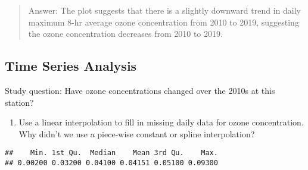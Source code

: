 \documentclass[
]{article}
\newenvironment{Shaded}{\begin{snugshade}}{\end{snugshade}}
\newcommand{\AttributeTok}[1]{\textcolor[rgb]{0.77,0.63,0.00}{#1}}
\newcommand{\CommentTok}[1]{\textcolor[rgb]{0.56,0.35,0.01}{\textit{#1}}}
\newcommand{\FloatTok}[1]{\textcolor[rgb]{0.00,0.00,0.81}{#1}}
\newcommand{\FunctionTok}[1]{\textcolor[rgb]{0.00,0.00,0.00}{#1}}
\newcommand{\NormalTok}[1]{#1}
\newcommand{\OtherTok}[1]{\textcolor[rgb]{0.56,0.35,0.01}{#1}}
\newcommand{\SpecialCharTok}[1]{\textcolor[rgb]{0.00,0.00,0.00}{#1}}
\providecommand{\tightlist}{%
  \setlength{\itemsep}{0pt}\setlength{\parskip}{0pt}}
\begin{document}
\begin{quote}
Answer: The plot suggests that there is a slightly downward trend in
daily maximum 8-hr average ozone concentration from 2010 to 2019,
suggesting the ozone concentration decreases from 2010 to 2019.
\end{quote}

\hypertarget{time-series-analysis}{%
\subsection{Time Series Analysis}\label{time-series-analysis}}

Study question: Have ozone concentrations changed over the 2010s at this
station?

\begin{enumerate}
\def\labelenumi{\arabic{enumi}.}
\setcounter{enumi}{7}
\tightlist
\item
  Use a linear interpolation to fill in missing daily data for ozone
  concentration. Why didn't we use a piece-wise constant or spline
  interpolation?
\end{enumerate}

\begin{Shaded}
\end{Shaded}

\begin{verbatim}
##    Min. 1st Qu.  Median    Mean 3rd Qu.    Max. 
## 0.00200 0.03200 0.04100 0.04151 0.05100 0.09300
\end{verbatim}
\end{document}
